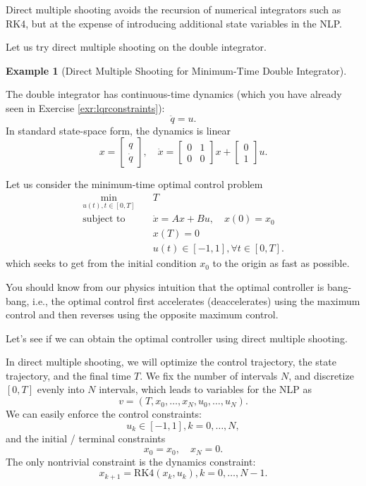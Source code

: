 \documentclass[
]{book}
\theoremstyle{definition}
\theoremstyle{definition}
\newtheorem{example}{Example}[chapter]
\theoremstyle{definition}
\theoremstyle{definition}
\theoremstyle{remark}
\begin{document}
Direct multiple shooting avoids the recursion of numerical integrators such as RK4, but at the expense of introducing additional state variables in the NLP.

Let us try direct multiple shooting on the double integrator.

\begin{example}[Direct Multiple Shooting for Minimum-Time Double Integrator]
\protect\hypertarget{exm:multiple-shooting-double-integrator}{}\label{exm:multiple-shooting-double-integrator}

The double integrator has continuous-time dynamics (which you have already seen in Exercise \ref{exr:lqrconstraints}):
\[
\ddot{q} = u.
\]
In standard state-space form, the dynamics is linear
\[
x = \begin{bmatrix} q \\ \dot{q} \end{bmatrix}, \quad 
\dot{x} = \begin{bmatrix} 0 & 1 \\ 0 & 0 \end{bmatrix} x + \begin{bmatrix} 0 \\ 1 \end{bmatrix} u.
\]

Let us consider the minimum-time optimal control problem
\begin{equation}
\begin{split}
\min_{u(t),t \in [0,T]} & \quad T \\
\text{subject to} & \quad \dot{x} = A x + Bu, \quad x(0) = x_0 \\
& \quad x(T) = 0 \\
& \quad u(t) \in [-1,1], \forall t \in [0,T].
\end{split}
\end{equation}
which seeks to get from the initial condition \(x_0\) to the origin as fast as possible.

You should know from our physics intuition that the optimal controller is bang-bang, i.e., the optimal control first accelerates (deaccelerates) using the maximum control and then reverses using the opposite maximum control.

Let's see if we can obtain the optimal controller using direct multiple shooting.

In direct multiple shooting, we will optimize the control trajectory, the state trajectory, and the final time \(T\). We fix the number of intervals \(N\), and discretize \([0,T]\) evenly into \(N\) intervals, which leads to variables for the NLP as
\[
v=(T,x_0,\dots,x_{N},u_0,\dots,u_N).
\]
We can easily enforce the control constraints:
\[
u_k \in [-1,1],k=0,\dots,N,
\]
and the initial / terminal constraints
\[
x_0 = x_0, \quad x_N = 0.
\]
The only nontrivial constraint is the dynamics constraint:
\[
x_{k+1} = \text{RK4}(x_k,u_k),k=0,\dots,N-1.
\]


\end{example}
\end{document}
